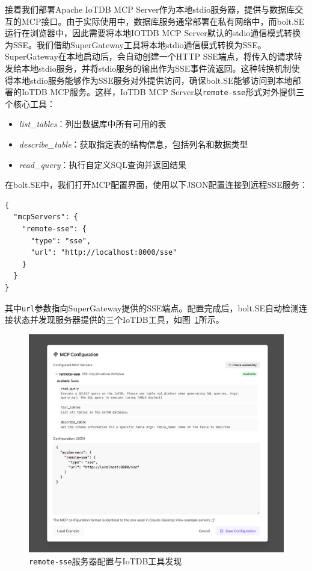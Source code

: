 接着我们部署Apache IoTDB MCP Server\cite{IoTDBMCP2025}作为本地stdio服务器，提供与数据库交互的MCP接口。由于实际使用中，数据库服务通常部署在私有网络中，而bolt.SE运行在浏览器中，因此需要将本地IOTDB MCP Server默认的stdio通信模式转换为SSE。我们借助SuperGateway\cite{SuperGateway2025}工具将本地stdio通信模式转换为SSE。SuperGateway在本地启动后，会自动创建一个HTTP SSE端点，将传入的请求转发给本地stdio服务，并将stdio服务的输出作为SSE事件流返回。这种转换机制使得本地stdio服务能够作为SSE服务对外提供访问，确保bolt.SE能够访问到本地部署的IoTDB MCP服务。这样，IoTDB MCP Server以\texttt{remote-sse}形式对外提供三个核心工具：
\begin{itemize}
  \item \textit{list\_tables}：列出数据库中所有可用的表
  \item \textit{describe\_table}：获取指定表的结构信息，包括列名和数据类型
  \item \textit{read\_query}：执行自定义SQL查询并返回结果
\end{itemize}

在bolt.SE中，我们打开MCP配置界面，使用以下JSON配置连接到远程SSE服务：

\begin{verbatim}
{
  "mcpServers": {
    "remote-sse": {
      "type": "sse",
      "url": "http://localhost:8000/sse"
    }
  }
}
\end{verbatim}

其中\texttt{url}参数指向SuperGateway提供的SSE端点。配置完成后，bolt.SE自动检测连接状态并发现服务器提供的三个IoTDB工具，如图~\ref{fig:mcp-config}所示。

\begin{figure}[H]
  \centering
  \includegraphics[width=\textwidth]{figures/screenshots/iotdb-demo/mcp-config.png}
  \caption{\texttt{remote-sse}服务器配置与IoTDB工具发现}
  \label{fig:mcp-config}
\end{figure}


